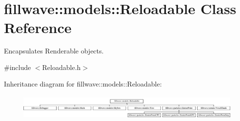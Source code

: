 \hypertarget{classfillwave_1_1models_1_1Reloadable}{}\section{fillwave\+:\+:models\+:\+:Reloadable Class Reference}
\label{classfillwave_1_1models_1_1Reloadable}


Encapsulates Renderable objects.  




{\ttfamily \#include $<$Reloadable.\+h$>$}

Inheritance diagram for fillwave\+:\+:models\+:\+:Reloadable\+:\begin{figure}[H]
\begin{center}
\leavevmode
\includegraphics[height=1.327014cm]{classfillwave_1_1models_1_1Reloadable}
\end{center}
\end{figure}
